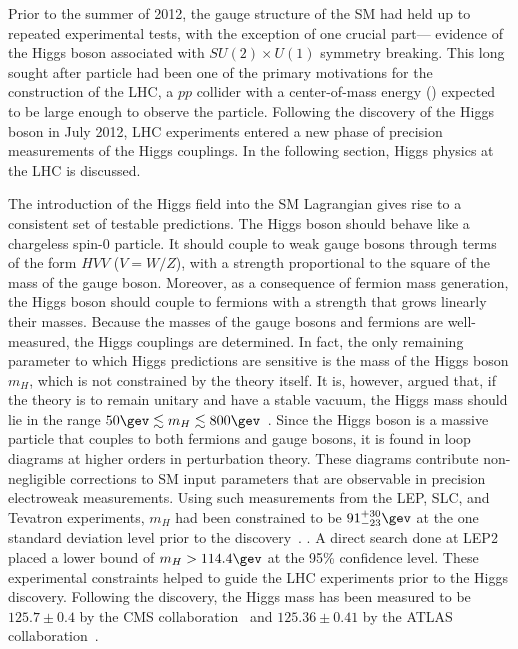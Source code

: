 
Prior to the summer of 2012, the gauge structure of the SM had held up
to repeated experimental tests, with the exception of one crucial
part--- evidence of the Higgs boson associated with $SU(2) \times
U(1)$ symmetry breaking. This long sought after particle had been one
of the primary motivations for the construction of the LHC, a $pp$
collider with a center-of-mass energy (\sqrts) expected to be large
enough to observe the particle. Following the discovery of the Higgs
boson in July 2012, LHC experiments entered a new phase of precision
measurements of the Higgs couplings. In the following section, Higgs
physics at the LHC is discussed.

The introduction of the Higgs field into the SM Lagrangian gives rise
to a consistent set of testable predictions. The Higgs boson should
behave like a chargeless spin-0 particle. It should couple to weak
gauge bosons through terms of the form $HVV$ ($V=W/Z$), with a strength
proportional to the square of the mass of the gauge boson. Moreover, as a
consequence of fermion mass generation, the Higgs boson should couple
to fermions with a strength that grows linearly their masses. Because the
masses of the gauge bosons and fermions are well-measured, the Higgs
couplings are determined. In fact, the only remaining parameter to which
Higgs predictions are sensitive is the mass of the Higgs boson $m_H$,
which is not constrained by the theory itself. It is, however,
argued that, if the theory is to remain unitary and have a stable vacuum,
the Higgs mass should lie in the range $50 \gev \lesssim m_H \lesssim
800 \gev$~\cite{bib:Djouadi:2005gi}. Since the Higgs boson is a
massive particle that couples to both fermions and gauge bosons, it is
found in loop diagrams at higher orders in perturbation theory. These
diagrams contribute non-negligible corrections to SM input parameters
that are observable in precision electroweak measurements. Using such measurements
from the LEP, SLC, and Tevatron experiments, $m_H$ had been
constrained to be $91^{+30}_{-23} \gev$ at the one standard deviation
level prior to the discovery~\cite{bib:Baak:2011ze}. . A direct search done at LEP2 placed a lower bound of $m_H >
114.4 \gev$ at the 95\% confidence level. These experimental
constraints helped to guide the LHC experiments prior to the Higgs
discovery. Following the discovery, the Higgs mass has been measured
to be $125.7 \pm 0.4$ by the CMS collaboration~\cite{bib:CMS-PAS-HIG-13-005} and $125.36 \pm
0.41$ by the ATLAS collaboration~\cite{bib:Aad:2014aba}. 

